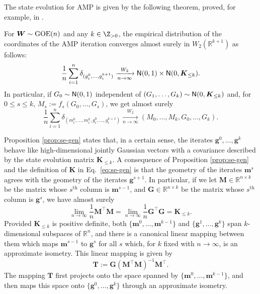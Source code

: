 \documentclass[]{article}
\def\bW{{\boldsymbol W}}
\def\normal{{\sf N}}
\def\bM{{\boldsymbol M}}
\def\bT{\boldsymbol{T}}
\def\bg{{\boldsymbol g}}
\def\reals{{\mathbb R}}
\def\bW{{\boldsymbol W}}
\def\bG{{\boldsymbol G}}
\def\normal{{\sf N}}
\def\bg{{\boldsymbol g}}
\def\GOE{{\rm GOE}}
\def\bbm{{\boldsymbol m}}
\def\bK{\boldsymbol{K}}
\begin{document}
The state evolution for AMP is given by the following theorem, proved, for example, in \cite{javanmardMontanari2013}.
\begin{proposition}
\label{prop:se-gen}
    For $\bW \sim \GOE(n)$ and any $k \in \Z_{>0}$,
    the empirical distribution of the coordinates of the AMP iteration converges almost surely 
    in $W_2(\reals^{k+1})$ as follows:
    \begin{equation}
        \frac1n \sum_{i=1}^n \delta_{(g_i^0,\ldots,g_i^{k+1})}
            \xrightarrow[n \rightarrow \infty]{W_2}
            \normal(0,1) \times \normal(0,\bK_{\leq k}).
    \end{equation}
    In particular, if $G_0 \sim \normal(0,1)$ independent of $(G_1,\ldots,G_k) \sim \normal(0,\bK_{\leq k})$ and, for $0 \leq s \leq k$, $M_s := f_s(G_0,\ldots,G_s)$,
    we get almost surely
    \begin{equation}
        \frac1n \sum_{i=1}^n \delta_{(m_i^0,\ldots,m_i^k,g_i^0,\ldots,g_i^{k+1})}
            \xrightarrow[n \rightarrow \infty]{W_2}
            (M_0,\ldots,M_k,G_0,\ldots,G_k).
    \end{equation}
\end{proposition}
Proposition \ref{prop:se-gen} states that, in a certain sense,
the iterates $\bg^0,\ldots,\bg^k$ behave like high-dimensional jointly Gaussian vectors with a covariance described by the state evolution matrix $\bK_{\leq k}$.
A consequence of Proposition \ref{prop:se-gen} and the definition of $\bK$ in Eq.~\eqref{eq:se-gen} is that the geometry of the iterates $\bbm^s$ agrees with the geometry of the iterates $\bg^{s+1}$.
In particular,
if we let $\bM \in \reals^{n \times k}$ be the matrix whose $s^\text{th}$ column is $\bbm^{s-1}$,
and $\bG \in \reals^{n \times k}$ be the matrix whose $s^\text{th}$ column is $\bg^s$, 
we have almost surely
\begin{equation}
    \lim_{n \rightarrow \infty} \frac1n\bM^\top \bM
        =
        \lim_{n \rightarrow \infty} \frac1n\bG^\top \bG
        =
        \bK_{\leq k}.
\end{equation}
Provided $\bK_{\leq k}$ is positive definite,
both $\{ \bbm^0,\ldots,\bbm^{k-1}\}$ and $\{ \bg^1,\ldots,\bg^k\}$ span $k$-dimensional subspaces of $\reals^n$, 
and there is a canonical linear mapping between them which maps $\bbm^{s-1}$ to $\bg^s$ for all $s$ which, for $k$ fixed with $n \rightarrow \infty$, is an approximate isometry.
This linear mapping is given by
\begin{equation}
\label{eq:T-AMP-gen}
    \bT := \bG (\bM^\top \bM)^{-1} \bM^\top.
\end{equation}
The mapping $\bT$ first projects onto the space spanned by $\{ \bbm^0,\ldots,\bbm^{k-1}\}$,
and then maps this space onto $\{ \bg^0,\ldots,\bg^k\}$ through an approximate isometry. 
\end{document}
